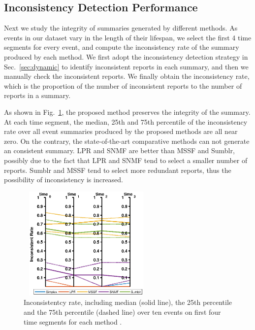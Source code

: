 \documentclass[envcountsame]{llncs}
\begin{document}
\subsection{Inconsistency Detection Performance}
Next we study the integrity of summaries generated by different methods. As events in our dataset vary in the length of their lifespan, we select the first 4 time segments for every event, and compute the inconsistency rate of the summary produced by each method. We first adopt the inconsistency detection strategy in Sec.~\ref{sec:dynamic} to identify inconsistent reports in each summary, and then we manually check the inconsistent reports. We finally obtain the inconsistency rate, which is the proportion of the number of inconsistent reports to the number of reports in a summary.

As shown in Fig.~\ref{fig:conflictRatio}, the proposed method preserves the integrity of the summary. At each time segment, the median, 25th and 75th percentile of the inconsistency rate over all event summaries produced by the proposed methods are all near zero. On the contrary, the state-of-the-art comparative methods can not generate an consistent summary. LPR and SNMF are better than MSSF and Sumblr, possibly due to the fact that LPR and SNMF tend to select a smaller number of reports. Sumblr and MSSF tend to select more redundant reports, thus the possibility of inconsistency is increased.

\vspace{-0.3cm}
\begin{figure}
    \centering
    \includegraphics[width=0.6\textwidth,height=2.2in]{confilct10.eps}
    \setlength{\abovecaptionskip}{-0.1cm}
    \caption{Inconsistentcy rate, including median (solid line), the  25th percentile and the 75th percentile (dashed line) over ten events on first four time segments for each method .}\label{fig:conflictRatio}
\end{figure}
\end{document}
